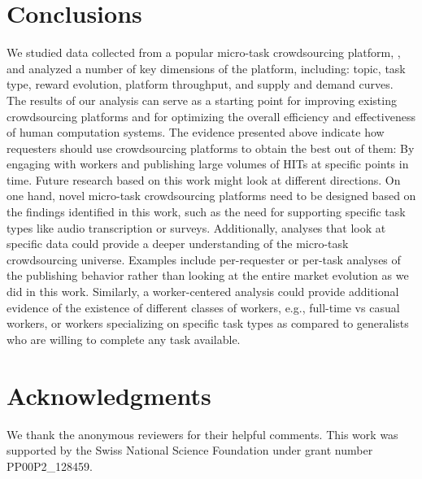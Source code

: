 \section{Conclusions}\label{sec:conc}
We studied data collected from a popular micro-task crowdsourcing platform, \amt{},
and analyzed a number of key dimensions of the platform, including: topic, task type, reward evolution, platform throughput, and supply and demand curves. The results of our analysis can serve as a starting point for improving existing crowdsourcing platforms and for optimizing the overall efficiency and effectiveness of human computation systems. The evidence presented above indicate how requesters should use crowdsourcing platforms to obtain the best out of them: By engaging with workers and publishing large volumes of HITs at specific points in time. 
Future research based on this work might look at different directions. On one hand, novel micro-task crowdsourcing platforms need to be designed based on the findings identified in this work, such as the need for supporting specific task types like audio transcription or surveys. 
Additionally, analyses that look at specific data could provide a deeper understanding of the micro-task crowdsourcing universe. Examples include per-requester or per-task analyses of the publishing behavior rather than looking at the entire market evolution as we did in this work.
Similarly, a worker-centered analysis could provide additional evidence of the existence of different classes of workers, e.g., full-time vs casual workers, or workers specializing on specific task types as compared to generalists who are willing to complete any task available.

\section{Acknowledgments}
We thank the anonymous reviewers for their helpful comments.
%
This work was supported by the Swiss National Science Foundation under grant number PP00P2\_128459.